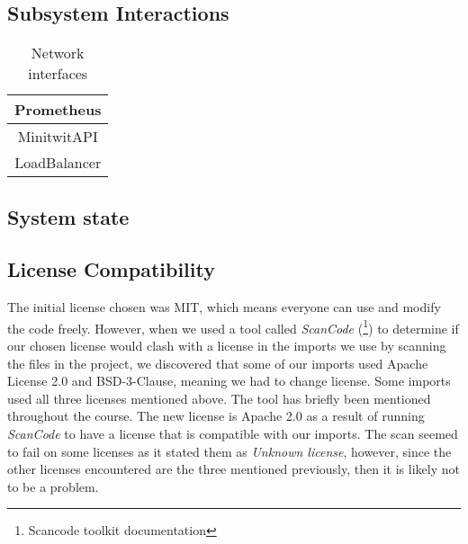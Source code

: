 \subsection{Subsystem Interactions}
\label{subsec:subsystem_interactions}
\begin{table}[h!]
    \centering
    \begin{tabular}{|c|} \hline
         Prometheus \\ \hline
         MinitwitAPI \\ \hline
         LoadBalancer \\ \hline
    \end{tabular}
    \caption{Network interfaces}
    \label{tab:my_label}
\end{table}

\subsection{System state}
\label{subsec:system_state}


\subsection{License Compatibility}
\label{subsec:license_compatability}
The initial license chosen was MIT, which means everyone can use and modify the code freely.
However, when we used a tool called \textit{ScanCode} (\footnote{Scancode toolkit documentation\cite{Scancode}}) to determine if our chosen license would clash with a license in the imports we use by scanning the files in the project, we discovered that some of our imports used Apache License 2.0 and BSD-3-Clause, meaning we had to change license. Some imports used all three licenses mentioned above. The tool has briefly been mentioned throughout the course.
The new license is Apache 2.0 as a result of running \textit{ScanCode} to have a license that is compatible with our imports. The scan seemed to fail on some licenses as it stated them as \textit{Unknown license}, however, since the other licenses encountered are the three mentioned previously, then it is likely not to be a problem.

